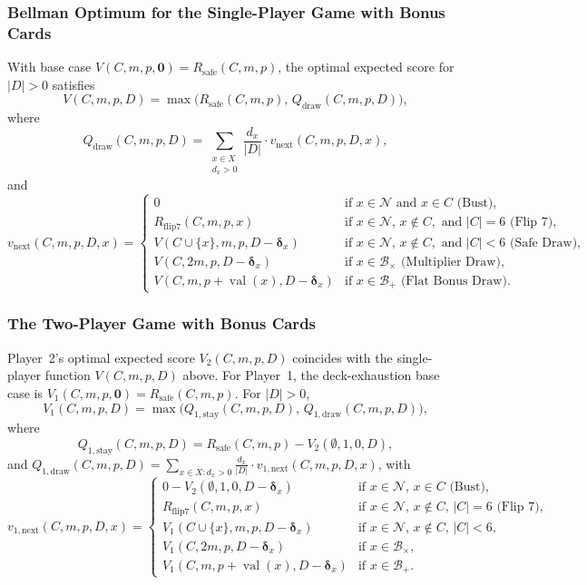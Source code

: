 \documentclass{article}
\theoremstyle{plain}
\theoremstyle{definition}
\theoremstyle{remark}
\DeclareMathOperator{\val}{val}
\begin{document}
\subsubsection{Bellman Optimum for the Single-Player Game with Bonus Cards}
With base case $V(C, m, p, \mathbf{0}) = R_{\text{safe}}(C, m, p)$, the optimal expected score for $|D| > 0$ satisfies
\[
    V(C, m, p, D) = \max \Big( R_{\text{safe}}(C, m, p), \, Q_{\text{draw}}(C, m, p, D) \Big),
\]
where
\[
    Q_{\text{draw}}(C, m, p, D) = \sum_{\substack{x \in X \\ d_x > 0}} \frac{d_x}{|D|} \cdot v_{\text{next}}(C, m, p, D, x),
\]
and
\[
    v_{\text{next}}(C, m, p, D, x) =
    \begin{cases}
        0 & \text{if } x \in \mathcal{N} \text{ and } x \in C \text{ (Bust)}, \\
        R_{\text{flip7}}(C, m, p, x) & \text{if } x \in \mathcal{N},\, x \notin C,\text{ and } |C| = 6 \text{ (Flip 7)}, \\
        V(C \cup \{x\}, m, p, D - \boldsymbol{\delta}_x) & \text{if } x \in \mathcal{N},\, x \notin C,\text{ and } |C| < 6 \text{ (Safe Draw)}, \\
        V(C, 2m, p, D - \boldsymbol{\delta}_x) & \text{if } x \in \mathcal{B}_{\times} \text{ (Multiplier Draw)}, \\
        V(C, m, p + \val(x), D - \boldsymbol{\delta}_x) & \text{if } x \in \mathcal{B}_{+} \text{ (Flat Bonus Draw)}.
    \end{cases}
\]

\subsubsection{The Two-Player Game with Bonus Cards}
Player~2's optimal expected score $V_2(C, m, p, D)$ coincides with the single-player function $V(C, m, p, D)$ above. For Player~1, the deck-exhaustion base case is $V_1(C, m, p, \mathbf{0}) = R_{\text{safe}}(C, m, p)$. For $|D| > 0$,
\[
    V_1(C, m, p, D) = \max \Big( Q_{1,\text{stay}}(C, m, p, D), \, Q_{1,\text{draw}}(C, m, p, D) \Big),
\]
where
\[
    Q_{1,\text{stay}}(C, m, p, D) = R_{\text{safe}}(C, m, p) - V_2(\emptyset, 1, 0, D),
\]
and $Q_{1,\text{draw}}(C, m, p, D) = \sum_{x \in X : d_x > 0} \frac{d_x}{|D|} \cdot v_{1,\text{next}}(C, m, p, D, x)$, with
\[
    v_{1,\text{next}}(C, m, p, D, x) =
    \begin{cases}
        0 - V_2(\emptyset, 1, 0, D - \boldsymbol{\delta}_x) & \text{if } x \in \mathcal{N},\, x \in C \text{ (Bust)}, \\
        R_{\text{flip7}}(C, m, p, x) & \text{if } x \in \mathcal{N},\, x \notin C,\, |C| = 6 \text{ (Flip 7)}, \\
        V_1(C \cup \{x\}, m, p, D - \boldsymbol{\delta}_x) & \text{if } x \in \mathcal{N},\, x \notin C,\, |C| < 6, \\
        V_1(C, 2m, p, D - \boldsymbol{\delta}_x) & \text{if } x \in \mathcal{B}_{\times}, \\
        V_1(C, m, p + \val(x), D - \boldsymbol{\delta}_x) & \text{if } x \in \mathcal{B}_{+}.
    \end{cases}
\]
\end{document}
